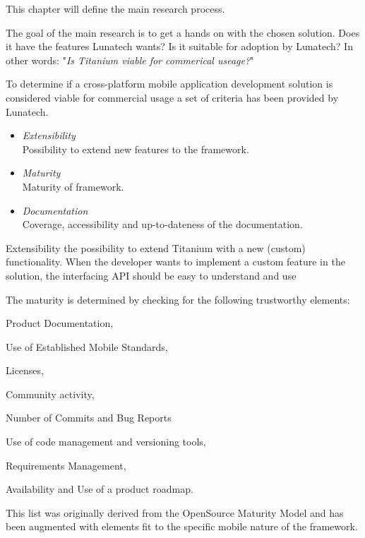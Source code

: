 This chapter will define the main research process. 

The goal of the main research is to get a hands on with the chosen solution. Does it have the features Lunatech wants? Is it suitable for adoption by Lunatech? In other words: "\emph{Is Titanium viable for commerical useage?}"

To determine if a cross-platform mobile application development solution is considered viable for commercial usage a set of criteria has been provided by Lunatech.
\begin{itemize}
	\item \emph{Extensibility}\\
	Possibility to extend new features to the framework.
	\item \emph{Maturity}\\ 
	Maturity of framework.
	\item \emph{Documentation}\\
	Coverage, accessibility and up-to-dateness of the documentation.
\end{itemize}


Extensibility the possibility to extend Titanium with a new (custom) functionality. 
When the developer wants to implement a custom feature in the solution, the interfacing API should be easy to understand and use

The maturity is determined by checking for the following trustworthy elements: \begin{inparaenum}
\item Product Documentation,
\item Use of Established Mobile Standards,
\item Licenses,
\item Community activity,
\item Number of Commits and Bug Reports
\item Use of code management and versioning tools,
\item Requirements Management,
\item Availability and Use of a product roadmap.
\end{inparaenum}
This list was originally derived from the OpenSource Maturity Model\cite{Wikipedia2011} and has been augmented with elements fit to the specific mobile nature of the framework.


